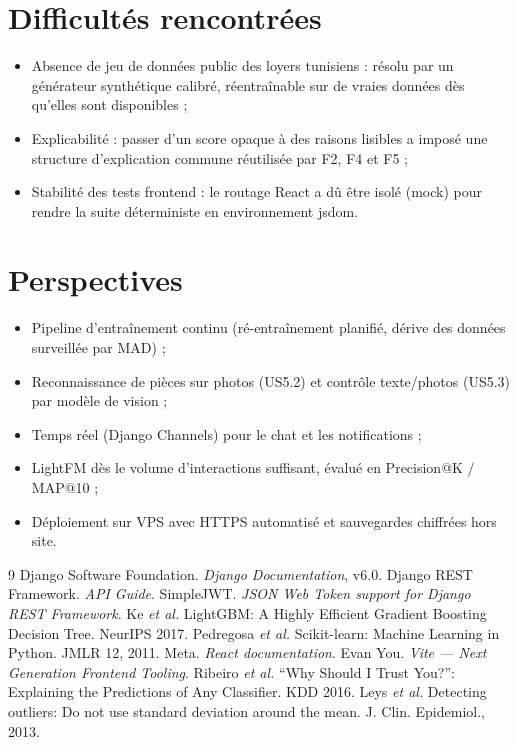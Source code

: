 \documentclass[11pt,a4paper]{report}
\begin{document}
\section{Difficultés rencontrées}
\begin{itemize}[leftmargin=*]
  \item Absence de jeu de données public des loyers tunisiens : résolu par un générateur
        synthétique calibré, réentraînable sur de vraies données dès qu'elles sont disponibles ;
  \item Explicabilité : passer d'un score opaque à des raisons lisibles a imposé une structure
        d'explication commune réutilisée par F2, F4 et F5 ;
  \item Stabilité des tests frontend : le routage React a dû être isolé (mock) pour rendre la
        suite déterministe en environnement jsdom.
\end{itemize}

\section{Perspectives}
\begin{itemize}[leftmargin=*]
  \item Pipeline d'entraînement continu (ré-entraînement planifié, dérive des données surveillée
        par MAD) ;
  \item Reconnaissance de pièces sur photos (US5.2) et contrôle texte/photos (US5.3) par modèle
        de vision ;
  \item Temps réel (Django Channels) pour le chat et les notifications ;
  \item LightFM dès le volume d'interactions suffisant, évalué en Precision@K / MAP@10 ;
  \item Déploiement sur VPS avec HTTPS automatisé et sauvegardes chiffrées hors site.
\end{itemize}

\begin{thebibliography}{9}
 Django Software Foundation. \textit{Django Documentation}, v6.0.
 Django REST Framework. \textit{API Guide}.
 SimpleJWT. \textit{JSON Web Token support for Django REST Framework}.
 Ke \emph{et al.} LightGBM: A Highly Efficient Gradient Boosting Decision Tree. NeurIPS 2017.
 Pedregosa \emph{et al.} Scikit-learn: Machine Learning in Python. JMLR 12, 2011.
 Meta. \textit{React documentation}.
 Evan You. \textit{Vite --- Next Generation Frontend Tooling}.
 Ribeiro \emph{et al.} ``Why Should I Trust You?'': Explaining the Predictions of Any Classifier. KDD 2016.
 Leys \emph{et al.} Detecting outliers: Do not use standard deviation around the mean. J. Clin. Epidemiol., 2013.
\end{thebibliography}
\end{document}
